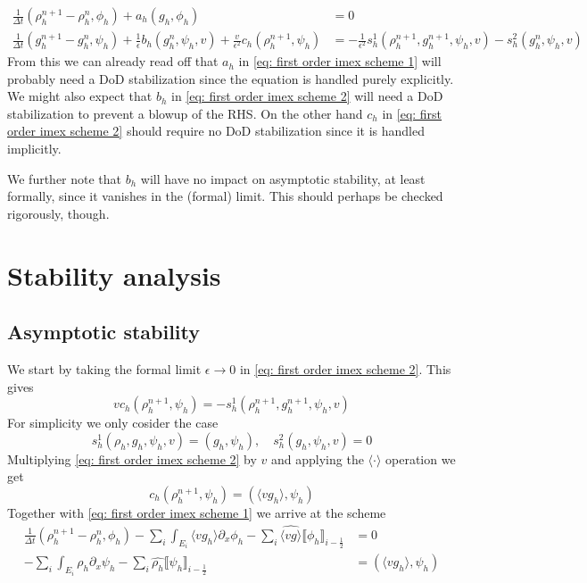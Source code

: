 \documentclass[]{article}
\begin{document}
\begin{subequations}
\begin{align}
\label{eq: first order imex scheme 1}  \frac{1}{\Delta t} (\rho_h^{n+1} - \rho_h^n, \phi_h) + a_h(g_h, \phi_h) & = 0 \\
\label{eq: first order imex scheme 2} \frac{1}{\Delta t} (g_h^{n+1} - g_h^n, \psi_h) + \frac{1}{\epsilon} b_h(g_h^n, \psi_h, v) + \frac{v}{\epsilon^2} c_h(\rho_h^{n+1}, \psi_h) & = - \frac{1}{\epsilon^2}s_h^1(\rho_h^{n+1}, g_h^{n+1}, \psi_h, v) - s_h^2(g_h^n, \psi_h, v)
\end{align}
\end{subequations}
From this we can already read off that $a_h$ in \eqref{eq: first order imex scheme 1} will probably need a DoD stabilization since the equation is handled purely explicitly. We might also expect that $b_h$ in \eqref{eq: first order imex scheme 2} will need a DoD stabilization to prevent a blowup of the RHS. On the other hand $c_h$ in \eqref{eq: first order imex scheme 2} should require no DoD stabilization since it is handled implicitly.

We further note that $b_h$ will have no impact on asymptotic stability, at least formally, since it vanishes in the (formal) limit. This should perhaps be checked rigorously, though.

\section{Stability analysis}

\subsection{Asymptotic stability}

We start by taking the formal limit $\epsilon \to 0$ in \eqref{eq: first order imex scheme 2}. This gives
\[
v c_h (\rho_h^{n+1}, \psi_h) = - s_h^1 (\rho_h^{n+1}, g_h^{n+1}, \psi_h, v)
\]
For simplicity we only cosider the case
\[
s_h^1(\rho_h, g_h, \psi_h, v) = (g_h, \psi_h), \quad s_h^2(g_h, \psi_h, v) = 0
\]
Multiplying \eqref{eq: first order imex scheme 2} by $v$ and applying the $\langle \cdot \rangle$ operation we get
\[
c_h(\rho_h^{n+1}, \psi_h) = (\langle vg_h \rangle, \psi_h)
\]
Together with \eqref{eq: first order imex scheme 1} we arrive at the scheme
\begin{align*}
	\frac{1}{\Delta t} (\rho_h^{n+1} - \rho_h^n, \phi_h) - \sum_i \int_{E_i} \langle v g_h \rangle \partial_x \phi_h - \sum_{i} \widehat{\langle v g \rangle} \llbracket \phi_h \rrbracket_{i-\frac{1}{2}} & = 0\\
	- \sum_i \int_{E_i} \rho_h \partial_x \psi_h - \sum_i \widehat{ \rho_h} \llbracket \psi_h \rrbracket_{i - \frac{1}{2}}  & = (\langle vg_h \rangle, \psi_h)
\end{align*}
\end{document}
